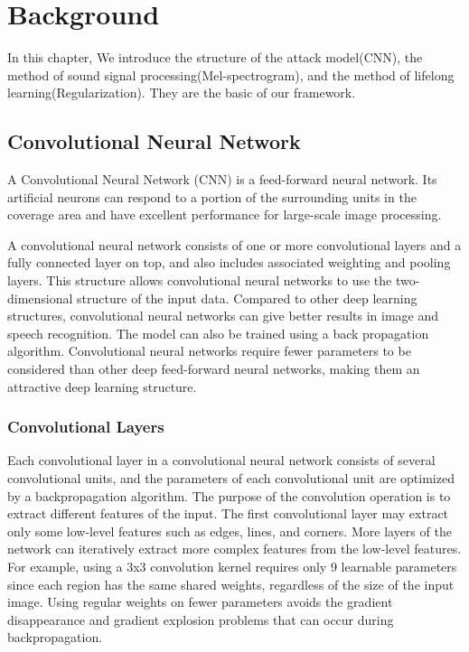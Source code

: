 \chapter{Background}
\label{chap:bg}
In this chapter, We introduce the structure of the attack model(CNN), the method of sound signal processing(Mel-spectrogram), and the method of lifelong learning(Regularization). They are the basic of our framework.

\section{Convolutional Neural Network }


A Convolutional Neural Network (CNN) is a feed-forward neural network. Its artificial neurons can respond to a portion of the surrounding units in the coverage area and have excellent performance for large-scale image processing.

A convolutional neural network consists of one or more convolutional layers and a fully connected layer on top, and also includes associated weighting and pooling layers. This structure allows convolutional neural networks to use the two-dimensional structure of the input data. Compared to other deep learning structures, convolutional neural networks can give better results in image and speech recognition. The model can also be trained using a back propagation algorithm. Convolutional neural networks require fewer parameters to be considered than other deep feed-forward neural networks, making them an attractive deep learning structure.

\subsection{Convolutional Layers}

Each convolutional layer in a convolutional neural network consists of several convolutional units, and the parameters of each convolutional unit are optimized by a backpropagation algorithm. The purpose of the convolution operation is to extract different features of the input. The first convolutional layer may extract only some low-level features such as edges, lines, and corners. More layers of the network can iteratively extract more complex features from the low-level features. For example, using a 3x3 convolution kernel requires only 9 learnable parameters since each region has the same shared weights, regardless of the size of the input image. Using regular weights on fewer parameters avoids the gradient disappearance and gradient explosion problems that can occur during backpropagation.

